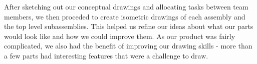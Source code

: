After sketching out our conceptual drawings and allocating tasks between team members, we then proceded to create isometric drawings of each assembly and the top level subassemblies.
This helped us refine our ideas about what our parts would look like and how we could improve them.
As our product was fairly complicated, we also had the benefit of improving our drawing skills - more than a few parts had interesting features that were a challenge to draw.

\newcommand{\Isometric}[1]{
  
}

\Isometric{Asimm}
 \Isometric{Juan}
